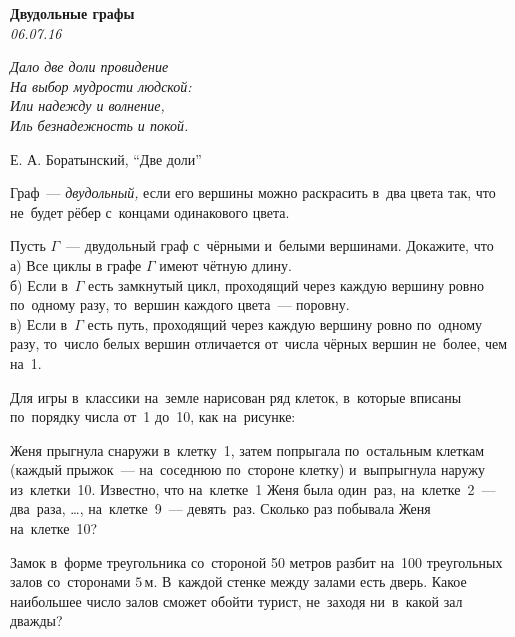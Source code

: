 \begin{center}
\textbf{\Large Двудольные графы}\\
\textit{06.07.16}
\end{center}

\epigraph{\it Дало две доли провидение \\
На выбор мудрости людской: \\
Или надежду и волнение, \\
Иль безнадежность и покой.}{Е. А. Боратынский, ``Две доли''}

Граф~--- \emph{двудольный,} если его вершины можно раскрасить в~два цвета так, что не~будет рёбер с~концами одинакового цвета.

\begin{problems}
\item
Пусть $\Gamma$~--- двудольный граф с~чёрными и~белыми вершинами.
Докажите, что\\
а) Все циклы в графе $\Gamma$ имеют чётную длину.\\
б) Если в~$\Gamma$ есть замкнутый цикл, проходящий через каждую вершину ровно по~одному разу, то~вершин каждого цвета~--- поровну.\\
в) Если в~$\Gamma$ есть путь, проходящий через каждую вершину ровно по~одному разу, то~число белых вершин отличается от~числа чёрных вершин не~более, чем на~1.

\item Для игры в~классики на~земле нарисован ряд клеток, в~которые вписаны по~порядку числа от~1 до~10, как на~рисунке:

\begin{figure}[h!]
\end{figure}

Женя прыгнула снаружи в~клетку~1, затем попрыгала по~остальным клеткам (каждый прыжок~--- на~соседнюю по~стороне клетку) и~выпрыгнула наружу из~клетки~10.
Известно, что на~клетке~1 Женя была один~раз, на~клетке~2~--- два~раза, \ldots, на~клетке~9~--- девять~раз.
Сколько раз побывала Женя на~клетке~10?

\item
Замок в~форме треугольника со~стороной 50 метров разбит на~100 треугольных залов со~сторонами $5\,\text{м}$.
В~каждой стенке между залами есть дверь.
Какое наибольшее число залов сможет обойти турист, не~заходя ни~в~какой зал дважды?


\end{problems}
